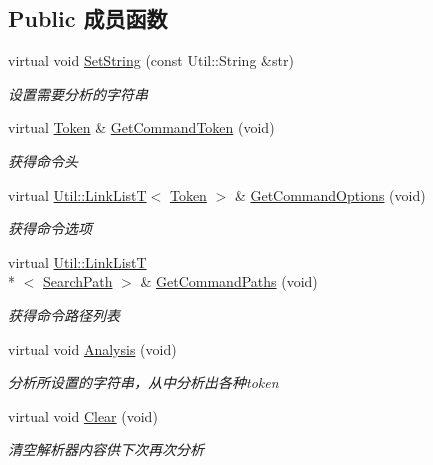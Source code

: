 \subsection*{Public 成员函数}
\begin{DoxyCompactItemize}
\item 
virtual void \hyperlink{class_lexer_sys_1_1_lexer_ac3a3c82b210ed2be7f1996180c124176}{Set\-String} (const Util\-::\-String \&str)
\begin{DoxyCompactList}\small\item\em 设置需要分析的字符串 \end{DoxyCompactList}\item 
virtual \hyperlink{class_lexer_sys_1_1_token}{Token} \& \hyperlink{class_lexer_sys_1_1_lexer_aa55e3ab31601792897465e2772eb255d}{Get\-Command\-Token} (void)
\begin{DoxyCompactList}\small\item\em 获得命令头 \end{DoxyCompactList}\item 
virtual \hyperlink{class_util_1_1_link_list_t}{Util\-::\-Link\-List\-T}$<$ \hyperlink{class_lexer_sys_1_1_token}{Token} $>$ \& \hyperlink{class_lexer_sys_1_1_lexer_a97215f1bea5d215e1260efb7a001c738}{Get\-Command\-Options} (void)
\begin{DoxyCompactList}\small\item\em 获得命令选项 \end{DoxyCompactList}\item 
virtual \hyperlink{class_util_1_1_link_list_t}{Util\-::\-Link\-List\-T}\\*
$<$ \hyperlink{class_lexer_sys_1_1_search_path}{Search\-Path} $>$ \& \hyperlink{class_lexer_sys_1_1_lexer_aead2ffdb9f57cc2cf582611b97557223}{Get\-Command\-Paths} (void)
\begin{DoxyCompactList}\small\item\em 获得命令路径列表 \end{DoxyCompactList}\item 
\hypertarget{class_lexer_sys_1_1_lexer_aea64d5beaaaa4339b2c2b152a0c420bf}{virtual void \hyperlink{class_lexer_sys_1_1_lexer_aea64d5beaaaa4339b2c2b152a0c420bf}{Analysis} (void)}\label{class_lexer_sys_1_1_lexer_aea64d5beaaaa4339b2c2b152a0c420bf}

\begin{DoxyCompactList}\small\item\em 分析所设置的字符串，从中分析出各种token \end{DoxyCompactList}\item 
\hypertarget{class_lexer_sys_1_1_lexer_a8921b421de22b3f7ef44cfadfe1e4dc7}{virtual void \hyperlink{class_lexer_sys_1_1_lexer_a8921b421de22b3f7ef44cfadfe1e4dc7}{Clear} (void)}\label{class_lexer_sys_1_1_lexer_a8921b421de22b3f7ef44cfadfe1e4dc7}

\begin{DoxyCompactList}\small\item\em 清空解析器内容供下次再次分析 \end{DoxyCompactList}\end{DoxyCompactItemize}
